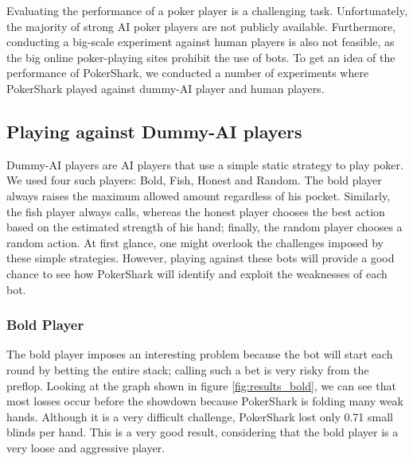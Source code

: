 
Evaluating the performance of a poker player is a challenging task. Unfortunately, the majority of strong AI poker players are not publicly available. Furthermore, conducting a big-scale experiment against human players is also not feasible, as the big online poker-playing sites prohibit the use of bots. To get an idea of the performance of PokerShark, we conducted a number of experiments where PokerShark played against dummy-AI player and human players. 

\subsection*{Playing against Dummy-AI players}
Dummy-AI players are AI players that use a simple static strategy to play poker. We used four such players: Bold, Fish, Honest and Random. The bold player always raises the maximum allowed amount regardless of his pocket. Similarly, the fish player always calls, whereas the honest player chooses the best action based on the estimated strength of his hand; finally, the random player chooses a random action.
At first glance, one might overlook the challenges imposed by these simple strategies. However, playing against these bots will provide a good chance to see how PokerShark will identify and exploit the weaknesses of each bot.


\subsubsection{Bold Player}
The bold player imposes an interesting problem because the bot will start each round by betting the entire stack; calling such a bet is very risky from the preflop. Looking at the graph shown in figure \ref{fig:results_bold}, we can see that most losses occur before the showdown because PokerShark is folding many weak hands. Although it is a very difficult challenge, PokerShark lost only 0.71 small blinds per hand. This is a very good result, considering that the bold player is a very loose and aggressive player.

